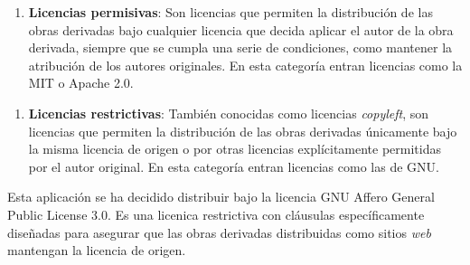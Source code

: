 \begin{enumerate}
	\item \textbf{Licencias permisivas}: Son licencias que permiten la distribución de las obras derivadas bajo cualquier licencia que decida aplicar el autor de la obra derivada, siempre que se cumpla una serie de condiciones, como mantener la atribución de los autores originales. En esta categoría entran licencias como la MIT o Apache 2.0.
\end{enumerate}

\begin{enumerate}
	\item \textbf{Licencias restrictivas}: También conocidas como licencias \textit{copyleft}, son licencias que permiten la distribución de las obras derivadas únicamente bajo la misma licencia de origen o por otras licencias explícitamente permitidas por el autor original. En esta categoría entran licencias como las de GNU.
\end{enumerate}

Esta aplicación se ha decidido distribuir bajo la licencia GNU Affero General Public License 3.0. Es una licenica restrictiva con cláusulas específicamente diseñadas para asegurar que las obras derivadas distribuidas como sitios \textit{web} mantengan la licencia de origen.
